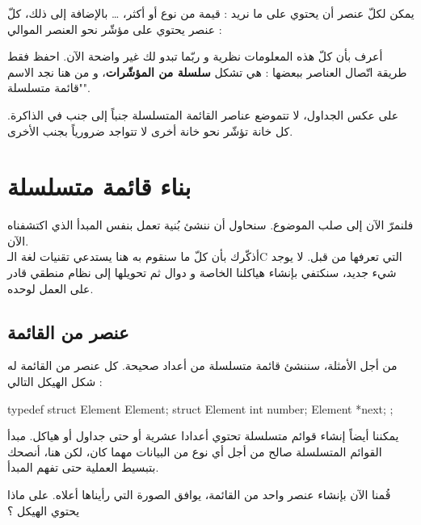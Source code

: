 
يمكن لكلّ عنصر أن يحتوي على ما نريد : قيمة من نوع 
أو أكثر،
 \dots
بالإضافة إلى ذلك، كلّ عنصر يحتوي على مؤشّر نحو العنصر الموالي :


أعرف بأن كلّ هذه المعلومات نظرية و ربّما تبدو لك غير واضحة الآن. احفظ فقط طريقة اتّصال العناصر ببعضها : هي تشكل 
\textbf{سلسلة من المؤشّرات}،
و من هنا نجد الاسم "قائمة متسلسلة". 

\begin{information}
على عكس الجداول، لا تتموضع عناصر القائمة المتسلسلة جنباً إلى جنب في الذاكرة. كل خانة تؤشّر نحو خانة أخرى لا تتواجد ضرورياً بجنب الأخرى.
\end{information}

\section{بناء قائمة متسلسلة}

فلنمرّ الآن إلى صلب الموضوع. سنحاول أن ننشئ بُنية تعمل بنفس المبدأ الذي اكتشفناه الآن.\\
أذكّرك بأن كلّ ما سنقوم به هنا يستدعي تقنيات لغة الـ\textenglish{C}
 التي تعرفها من قبل. لا يوجد شيء جديد، سنكتفي بإنشاء هياكلنا الخاصة و دوال ثم تحويلها إلى نظام منطقي قادر على العمل لوحده.

\subsection{عنصر من القائمة}

من أجل الأمثلة، سننشئ قائمة متسلسلة من أعداد صحيحة. كل عنصر من القائمة له شكل الهيكل التالي :

\begin{Csource}
typedef struct Element Element;
struct Element
{
	int number;
	Element *next;
};
\end{Csource}

\begin{information}
يمكننا أيضاً إنشاء قوائم متسلسلة تحتوي أعدادا عشرية أو حتى جداول أو هياكل. مبدأ القوائم المتسلسلة صالح من أجل أي نوع من البيانات مهما كان، لكن هنا، أنصحك بتبسيط العملية حتى تفهم المبدأ.
\end{information}

قُمنا الآن بإنشاء عنصر واحد من القائمة، يوافق الصورة التي رأيناها أعلاه. على ماذا يحتوي الهيكل ؟

